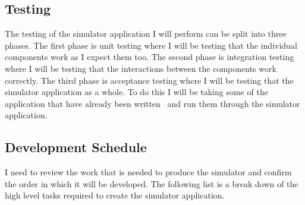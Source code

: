 \documentclass[11pt]{article} %
\begin{document}
\subsection{Testing}
The testing of the simulator application I will perform can be split into three phases. The first phase is unit testing where I will be testing that the individual components work as I expect them too. The second phase is integration testing where I will be testing that the interactions between the components work correctly. The third phase is acceptance testing where I will be testing that the simulator application as a whole. To do this I will be taking some of the application that have already been written~\cite{ref:mmixmaster} and run them through the simulator application. 
\subsection{Development Schedule}
I need to review the work that is needed to produce the simulator and confirm the order in which it will be developed. The following list is a break down of the high level tasks required to create the simulator application. 
\end{document}
